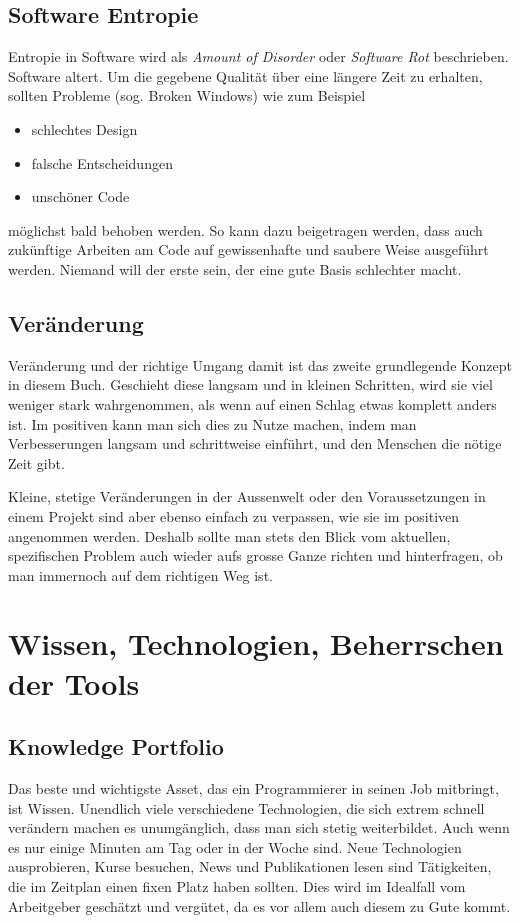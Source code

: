 \documentclass[10pt, oneside]{article}
\begin{document}
\subsection{Software Entropie}
Entropie in Software wird als \emph{Amount of Disorder} oder \emph{Software Rot} beschrieben. 
Software altert. Um die gegebene Qualität über eine längere Zeit zu erhalten, sollten Probleme 
(sog. Broken Windows) wie zum Beispiel
\begin{itemize}[itemsep=4pt]
    \item schlechtes Design
    \item falsche Entscheidungen
    \item unschöner Code
\end{itemize}
möglichst bald behoben werden. So kann dazu beigetragen werden, dass auch zukünftige Arbeiten
am Code auf gewissenhafte und saubere Weise ausgeführt werden. Niemand will der erste sein, der eine gute Basis schlechter macht.

\subsection{Veränderung}
Veränderung und der richtige Umgang damit ist das zweite grundlegende Konzept in diesem Buch. Geschieht diese langsam und in kleinen Schritten, 
wird sie viel weniger stark wahrgenommen, als wenn auf einen Schlag etwas komplett anders ist.
Im positiven kann man sich dies zu Nutze machen, indem man Verbesserungen langsam und schrittweise einführt, und den Menschen die nötige Zeit gibt.

Kleine, stetige Veränderungen in der Aussenwelt oder den Voraussetzungen in einem Projekt sind aber ebenso 
einfach zu verpassen, wie sie im positiven angenommen werden. Deshalb sollte man stets den Blick
vom aktuellen, spezifischen Problem auch wieder aufs grosse Ganze richten und hinterfragen, ob man immernoch 
auf dem richtigen Weg ist. 

\section{Wissen, Technologien, Beherrschen der Tools}
\subsection{Knowledge Portfolio}
Das beste und wichtigste Asset, das ein Programmierer in seinen Job mitbringt, ist Wissen. Unendlich viele verschiedene Technologien, die
sich extrem schnell verändern machen es unumgänglich, dass man sich stetig weiterbildet. Auch wenn es nur einige Minuten am Tag oder in der Woche sind.
Neue Technologien ausprobieren, Kurse besuchen, News und Publikationen lesen sind Tätigkeiten, die im Zeitplan einen fixen Platz haben sollten. Dies wird im 
Idealfall vom Arbeitgeber geschätzt und vergütet, da es vor allem auch diesem zu Gute kommt.
\end{document}
